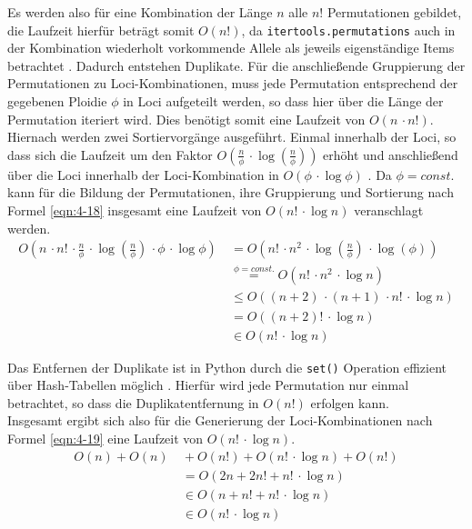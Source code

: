 Es werden also für eine Kombination der Länge $n$ alle $n!$ Permutationen gebildet, die Laufzeit hierfür beträgt somit $ O(n!) $, da \lstinline|itertools.permutations| auch in der Kombination wiederholt vorkommende Allele als jeweils eigenständige Items betrachtet \cite{itertools}. Dadurch entstehen Duplikate. Für die anschließende Gruppierung der Permutationen zu Loci-Kombinationen, muss jede Permutation entsprechend der gegebenen Ploidie $\phi$ in Loci aufgeteilt werden, so dass hier über die Länge der Permutation iteriert wird. Dies benötigt somit eine Laufzeit von $O(n  \, \cdotp n!)$. Hiernach werden zwei Sortiervorgänge ausgeführt. Einmal innerhalb der Loci, so dass sich die Laufzeit um den Faktor $ O\left( \frac{n}{\phi}\, \cdotp \log\left( \frac{n}{\phi}\right)\right)  $ erhöht und anschließend über die Loci innerhalb der Loci-Kombination in $O(\phi\, \cdotp \log\phi)$ \cite{python-sort}. Da $\phi = const.$ kann für die Bildung der Permutationen, ihre Gruppierung und Sortierung nach Formel \eqref{eqn:4-18} insgesamt eine Laufzeit von $O\left( n! \, \cdotp \log n \right) $ veranschlagt werden. \\
\begin{equation} \label{eqn:4-18}
\tag{4-18}
\begin{aligned}
O\left( n \, \cdotp n! \, \cdotp \frac{n}{\phi}\, \cdotp \log\left( \frac{n}{\phi}\right) \, \cdotp \phi\, \cdotp \log\phi\right) &\ {} =  O\left( n! \, \cdotp n^2 \, \cdotp \log\left( \frac{n}{\phi}\right) \, \cdotp \log(\phi)\right)\\
&\ \stackrel{\phi = const.}{=} O\left( n! \, \cdotp n^2 \, \cdotp \log n \right)\\
&\ \leq O((n + 2) \, \cdotp (n + 1) \, \cdotp n! \, \cdotp \log n ) \\
&\ = O( (n + 2)! \, \cdotp \log n)\\
&\ \in O(n ! \, \cdotp \log n)
\end{aligned}
\end{equation}

Das Entfernen der Duplikate ist in Python durch die \lstinline|set()| Operation effizient über Hash-Tabellen  möglich \cite{python-sort}. Hierfür wird jede Permutation nur einmal betrachtet, so dass die Duplikatentfernung in $O(n!)$ erfolgen kann. \\

Insgesamt ergibt sich also für die Generierung der Loci-Kombinationen nach Formel \eqref{eqn:4-19} eine Laufzeit von $ O(n!\, \cdotp \log n) $.
\begin{equation} \label{eqn:4-19}
\tag{4-19}
\begin{aligned}
O(n) + O(n) &\ {} + O(n!) + O(n ! \, \cdotp \log n) + O(n!) \\
&\ = O(2n + 2 n! + n ! \, \cdotp \log n) \\
&\ {} \in O(n + n! + n ! \, \cdotp \log n)\\
&\ {} \in O(n ! \, \cdotp \log n)\\
\end{aligned}
\end{equation}

